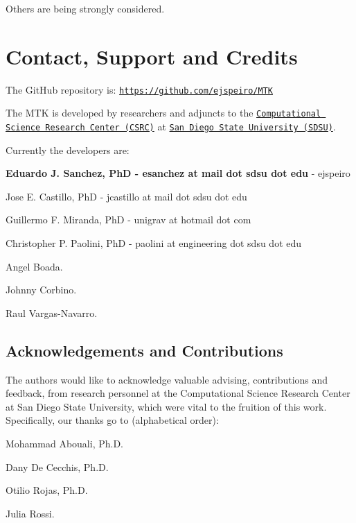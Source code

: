 Others are being strongly considered.\hypertarget{index_section_authors}{}\section{Contact, Support and Credits}\label{index_section_authors}
The Git\+Hub repository is\+: \href{https://github.com/ejspeiro/MTK}{\tt https\+://github.\+com/ejspeiro/\+M\+T\+K}

The M\+T\+K is developed by researchers and adjuncts to the \href{http://www.csrc.sdsu.edu/}{\tt Computational Science Research Center (C\+S\+R\+C)} at \href{http://www.sdsu.edu/}{\tt San Diego State University (S\+D\+S\+U)}.

Currently the developers are\+:


\begin{DoxyItemize}
\item {\bfseries Eduardo J. Sanchez, Ph\+D -\/ esanchez at mail dot sdsu dot edu} -\/ ejspeiro
\item Jose E. Castillo, Ph\+D -\/ jcastillo at mail dot sdsu dot edu
\item Guillermo F. Miranda, Ph\+D -\/ unigrav at hotmail dot com
\item Christopher P. Paolini, Ph\+D -\/ paolini at engineering dot sdsu dot edu
\item Angel Boada.
\item Johnny Corbino.
\item Raul Vargas-\/\+Navarro.
\end{DoxyItemize}\hypertarget{index_subsection_acknowledgements}{}\subsection{Acknowledgements and Contributions}\label{index_subsection_acknowledgements}
The authors would like to acknowledge valuable advising, contributions and feedback, from research personnel at the Computational Science Research Center at San Diego State University, which were vital to the fruition of this work. Specifically, our thanks go to (alphabetical order)\+:


\begin{DoxyEnumerate}
\item Mohammad Abouali, Ph.\+D.
\item Dany De Cecchis, Ph.\+D.
\item Otilio Rojas, Ph.\+D.
\item Julia Rossi. 
\end{DoxyEnumerate}
